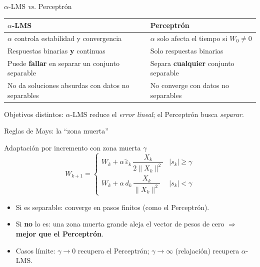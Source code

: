 \documentclass[aspectratio=169, 11pt, xcolor={dvipsnames,table}]{beamer}
\newcommand{\azul}[1]{\textcolor{UsachAzul}{#1}}
\begin{document}
\begin{frame}{$\alpha$-LMS \textit{vs.} Perceptrón}
\renewcommand{\arraystretch}{1.25}
\begin{center}
\begin{tabular}{@{}p{}|p{}@{}}
\toprule
\azul{\textbf{$\alpha$-LMS}} & \azul{\textbf{Perceptrón}} \\
\midrule
$\alpha$ controla estabilidad y convergencia & $\alpha$ solo afecta el tiempo si $W_0\neq0$ \\
Respuestas binarias \textbf{y} continuas & Solo respuestas binarias \\
Puede \textbf{fallar} en separar un conjunto separable & Separa \textbf{cualquier} conjunto separable \\
No da soluciones absurdas con datos no separables & No converge con datos no separables \\
\bottomrule
\end{tabular}
\end{center}
\begin{tipbox}
Objetivos distintos: $\alpha$-LMS reduce el \emph{error lineal}; el Perceptrón busca \emph{separar}.
\end{tipbox}
\end{frame}

\begin{frame}{Reglas de Mays: la ``zona muerta''}
\begin{block}{Adaptación por incremento con zona muerta $\gamma$}
\[
W_{k+1} =
\begin{cases}
W_k + \alpha\,\tilde{\varepsilon}_k\,\dfrac{X_k}{2\lVert X_k\rVert^{2}} & |s_k| \geq \gamma \\[8pt]
W_k + \alpha\,d_k\,\dfrac{X_k}{\lVert X_k\rVert^{2}} & |s_k| < \gamma
\end{cases}
\]
\end{block}
\begin{itemize}
  \item Si es separable: converge en pasos finitos (como el Perceptrón).
  \item Si \textbf{no} lo es: una zona muerta grande \azul{aleja el vector de pesos de cero} $\Rightarrow$ \textbf{mejor que el Perceptrón}.
  \item Casos límite: $\gamma\to0$ recupera el Perceptrón; $\gamma\to\infty$ (relajación) recupera $\alpha$-LMS.
\end{itemize}
\end{frame}
\end{document}

